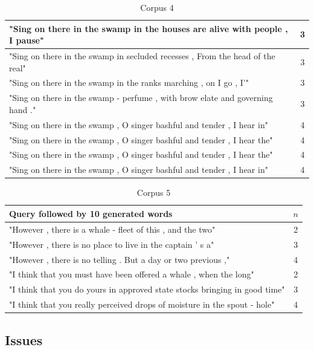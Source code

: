 \documentclass[a4paper,12pt]{article}
\begin{document}
\begin{table}
\begin{tabular}{| l |c|}
"Sing on there in the swamp in the houses are alive with people , I pause" & 3 \\ \hline
"Sing on there in the swamp in secluded recesses , From the head of the real" & 3 \\ \hline
"Sing on there in the swamp in the ranks marching , on I go , I'" & 3 \\ \hline
"Sing on there in the swamp - perfume , with brow elate and governing hand ." & 3 \\ \hline

"Sing on there in the swamp , O singer bashful and tender , I hear in" & 4 \\ \hline
"Sing on there in the swamp , O singer bashful and tender , I hear the" & 4 \\ \hline
"Sing on there in the swamp , O singer bashful and tender , I hear the" & 4 \\ \hline
"Sing on there in the swamp , O singer bashful and tender , I hear in" & 4 \\ \hline

\end{tabular}
\caption{ Corpus 4}
\label{tab:corpus4}
\end{table}

\begin{table}
\small
\begin{tabular}{| l |c|}
\hline
Query followed by 10 generated words & $n$ \\ \hline
"However , there is a whale - fleet of this , and the two" & 2\\ \hline
"However , there is no place to live in the captain ' s a"& 3 \\ \hline
"However , there is no telling . But a day or two previous ," & 4 \\ \hline
"I think that you must have been offered a whale , when the long" & 2\\ \hline
"I think that you do yours in approved state stocks bringing in good time"& 3 \\ \hline
"I think that you really perceived drops of moisture in the spout - hole" & 4 \\ \hline
\end{tabular}
\caption{Corpus 5}
\label{tab:corpus5}
\end{table}

\subsection{Issues}
\end{document}
